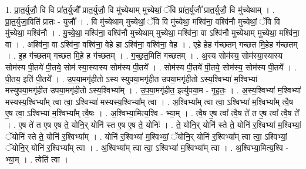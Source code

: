 \documentclass[17pt]{extarticle}
\begin{document}
1. प्रा॒त॒र्युजौ॒ वि वि प्रा॑त॒र्युजौ᳚ प्रात॒र्युजौ॒ वि मु॑च्येथाम् मुच्येथां॒ ॅवि प्रा॑त॒र्युजौ᳚ प्रात॒र्युजौ॒ वि मु॑च्येथाम् । . प्रा॒त॒र्युजा॒विति॑ प्रातः - युजौ᳚ । . वि मु॑च्येथाम् मुच्येथां॒ ॅवि वि मु॑च्येथा॒ मश्वि॑ना॒ वश्वि॑नौ मुच्येथां॒ ॅवि वि मु॑च्येथा॒ मश्वि॑नौ । . मु॒च्ये॒था॒ मश्वि॑ना॒ वश्वि॑नौ मुच्येथाम् मुच्येथा॒ मश्वि॑ना॒ वा ऽश्वि॑नौ मुच्येथाम् मुच्येथा॒ मश्वि॑ना॒ वा । . अश्वि॑ना॒ वा ऽश्वि॑ना॒ वश्वि॑ना॒ वेहे हा ऽश्वि॑ना॒ वश्वि॑ना॒ वेह । . एहे हेह ग॑च्छतम् गच्छत मि॒हेह ग॑च्छतम् । . इ॒ह ग॑च्छतम् गच्छत मि॒हे ह ग॑च्छतम् । . ग॒च्छ॒त॒मिति॑ गच्छतम् । . अ॒स्य सोम॑स्य॒ सोम॑स्या॒स्यास्य सोम॑स्य पी॒तये॑ पी॒तये॒ सोम॑ स्या॒स्यास्य सोम॑स्य पी॒तये᳚ । . सोम॑स्य पी॒तये॑ पी॒तये॒ सोम॑स्य॒ सोम॑स्य पी॒तये᳚ । . पी॒तय॒ इति॑ पी॒तये᳚ । . उ॒प॒या॒मगृ॑हीतो ऽस्य स्युपया॒मगृ॑हीत उपया॒मगृ॑हीतो ऽस्य॒श्विभ्या॑ म॒श्विभ्या॑ मस्युपया॒मगृ॑हीत उपया॒मगृ॑हीतो ऽस्य॒श्विभ्या᳚म् । . उ॒प॒या॒मगृ॑हीत॒ इत्यु॑पया॒म - गृ॒ह॒तः॒ । . अ॒स्य॒श्विभ्या॑ म॒श्विभ्या॑ मस्यस्य॒श्विभ्या᳚म् त्वा त्वा॒ ऽश्विभ्या॑ मस्यस्य॒श्विभ्या᳚म् त्वा । . अ॒श्विभ्या᳚म् त्वा त्वा॒ ऽश्विभ्या॑ म॒श्विभ्या᳚म् त्वै॒ष ए॒ष त्वा॒ ऽश्विभ्या॑ म॒श्विभ्या᳚म् त्वै॒षः । . अ॒श्विभ्या॒मित्य॒श्वि - भ्या॒म् । . त्वै॒ष ए॒ष त्वा᳚ त्वै॒ष ते॑ त ए॒ष त्वा᳚ त्वै॒ष ते᳚ । . ए॒ष ते॑ त ए॒ष ए॒ष ते॒ योनि॒र् योनि॑ स्त ए॒ष ए॒ष ते॒ योनिः॑ । . ते॒ योनि॒र् योनि॑ स्ते ते॒ योनि॑ र॒श्विभ्या॑ म॒श्विभ्यां॒ ॅयोनि॑ स्ते ते॒ योनि॑ र॒श्विभ्या᳚म् । . योनि॑ र॒श्विभ्या॑ म॒श्विभ्यां॒ ॅयोनि॒र् योनि॑ र॒श्विभ्या᳚म् त्वा त्वा॒ ऽश्विभ्यां॒ ॅयोनि॒र् योनि॑ र॒श्विभ्या᳚म् त्वा । . अ॒श्विभ्या᳚म् त्वा त्वा॒ ऽश्विभ्या॑ म॒श्विभ्या᳚म् त्वा । . अ॒श्विभ्या॒मित्य॒श्वि - भ्या॒म् । . त्वेति॑ त्वा । \newline
\pagebreak
{}
\end{document}
